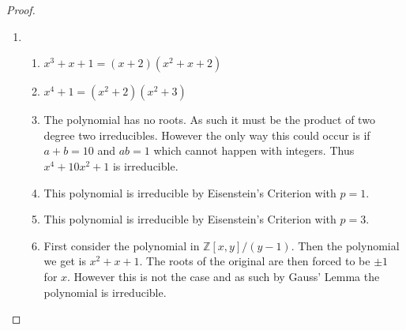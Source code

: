 \documentclass[10pt]{article}
\newcommand{\bb}[1]{\mathbb{#1}}
\theoremstyle{plain}
\theoremstyle{remark}
\begin{document}
\begin{proof}
  \begin{enumerate}
  \item
    \begin{enumerate}
    \item $x^3+x+1=(x+2)(x^2+x+2)$
    \item $x^4+1=(x^2+2)(x^2+3)$
    \item The polynomial has no roots. As such it must be the product of two
      degree two irreducibles. However the only way this could occur is
      if $a+b=10$ and $ab=1$ which cannot happen with integers.
      Thus $x^4+10x^2+1$ is irreducible.
    \item This polynomial is irreducible by Eisenstein's Criterion with
      $p=1$.
    \item This polynomial is irreducible by Eisenstein's Criterion with
      $p=3$.
    \item First consider the polynomial in $\bb{Z}[x,y]/(y-1)$. Then the
      polynomial we get is $x^2+x+1$. The roots of the original are then
      forced to be $\pm 1$ for $x$. However this is not the case and as
      such by Gauss' Lemma the polynomial is irreducible.


\end{enumerate}
\end{enumerate}
\end{proof}
\end{document}
